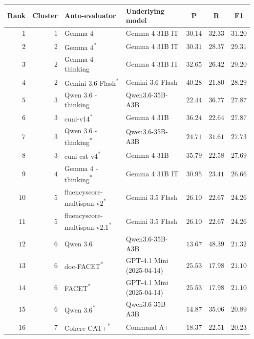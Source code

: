 \begin{table}[t]
\centering
\small
\begin{tabular}{rrllrrr}
\toprule
\multicolumn{1}{c}{Rank} & \multicolumn{1}{c}{Cluster} & Auto-evaluator & Underlying model & \multicolumn{1}{c}{P} & \multicolumn{1}{c}{R} & \multicolumn{1}{c}{F1} \\
\midrule
\rowcolor{black!15} $1$ & $1$ & Gemma 4 & Gemma 4 31B IT & $30.14$ & $32.33$ & $31.20$ \\
\rowcolor{black!15} $2$ & $2$ & Gemma 4\textsuperscript{*} & Gemma 4 31B IT & $30.31$ & $28.37$ & $29.31$ \\
\rowcolor{black!15} $3$ & $2$ & Gemma 4 - thinking & Gemma 4 31B IT & $32.65$ & $26.42$ & $29.20$ \\
\rowcolor{black!15} $4$ & $2$ & Gemini-3.6-Flash\textsuperscript{*} & Gemini 3.6 Flash & $40.28$ & $21.80$ & $28.29$ \\
\rowcolor{black!15} $5$ & $3$ & Qwen 3.6 - thinking & Qwen3.6-35B-A3B & $22.44$ & $36.77$ & $27.87$ \\
$6$ & $3$ & cuni-v14\textsuperscript{*} & Gemma 4 31B & $36.24$ & $22.64$ & $27.87$ \\
\rowcolor{black!15} $7$ & $3$ & Qwen 3.6 - thinking\textsuperscript{*} & Qwen3.6-35B-A3B & $24.71$ & $31.61$ & $27.73$ \\
$8$ & $3$ & cuni-cat-v4\textsuperscript{*} & Gemma 4 31B & $35.79$ & $22.58$ & $27.69$ \\
\rowcolor{black!15} $9$ & $4$ & Gemma 4 - thinking\textsuperscript{*} & Gemma 4 31B IT & $30.95$ & $23.41$ & $26.66$ \\
$10$ & $5$ & fluencyscore-multispan-v2\textsuperscript{*} & Gemini 3.5 Flash & $26.10$ & $22.67$ & $24.26$ \\
$11$ & $5$ & fluencyscore-multispan-v2.1\textsuperscript{*} & Gemini 3.5 Flash & $26.10$ & $22.67$ & $24.26$ \\
\rowcolor{black!15} $12$ & $6$ & Qwen 3.6 & Qwen3.6-35B-A3B & $13.67$ & $48.39$ & $21.32$ \\
$13$ & $6$ & doc-FACET\textsuperscript{*} & GPT-4.1 Mini (2025-04-14) & $25.53$ & $17.98$ & $21.10$ \\
$14$ & $6$ & FACET\textsuperscript{*} & GPT-4.1 Mini (2025-04-14) & $25.53$ & $17.98$ & $21.10$ \\
\rowcolor{black!15} $15$ & $6$ & Qwen 3.6\textsuperscript{*} & Qwen3.6-35B-A3B & $14.87$ & $35.06$ & $20.89$ \\
$16$ & $7$ & Cohere CAT+\textsuperscript{*} & Command A+ & $18.37$ & $22.51$ & $20.23$ \\

\end{tabular}
\end{table}

